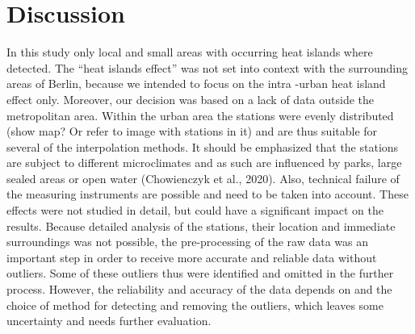 
\section{Discussion}

In this study only local and small areas with occurring heat islands where detected. The “heat islands effect” was not set into context with the surrounding areas of Berlin, because we intended to focus on the intra -urban heat island effect only. Moreover, our decision was based on a lack of data outside the metropolitan area. Within the urban area the stations were evenly distributed (show map? Or refer to image with stations in it) and are thus suitable for several of the interpolation methods. It should be emphasized that the stations are subject to different microclimates and as such are influenced by parks, large sealed areas or open water (Chowienczyk et al., 2020). Also, technical failure of the measuring instruments are possible and need to be taken into account. These effects were not studied in detail, but could have a significant impact on the results. Because detailed analysis of the stations, their location and immediate surroundings was not possible, the pre-processing of the raw data was an important step in order to receive more accurate and reliable data without outliers. Some of these outliers thus were identified and omitted in the further process. However, the reliability and accuracy of the data depends on and the choice of method for detecting and removing the outliers, which leaves some uncertainty and needs further evaluation. 


